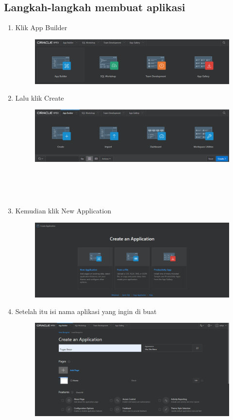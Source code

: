 \documentclass[12pt, times new roman, a4paper]{report}
\begin{document}
\subsection{Langkah-langkah membuat aplikasi}
\begin{enumerate}
\item Klik App Builder
\begin{figure}[h]
	\centering
		\includegraphics[scale=0.3]{gambar/26}
\end{figure}

\item Lalu klik Create
\begin{figure}[h]
	\centering
		\includegraphics[scale=0.3]{gambar/27}
\end{figure}
\\
\\
\\
\item Kemudian klik New Application
\begin{figure}[h]
	\centering
		\includegraphics[scale=0.25]{gambar/28}
\end{figure}

\item Setelah itu isi nama aplikasi yang ingin di buat
\begin{figure}[h]
	\centering
		\includegraphics[scale=0.25]{gambar/29}
\end{figure}


\end{enumerate}
\end{document}
